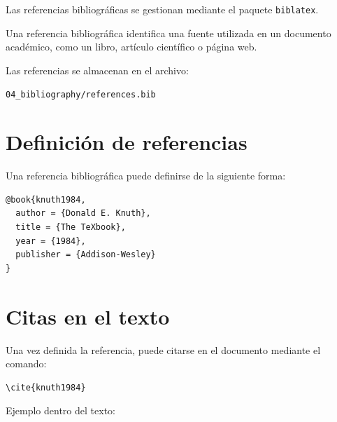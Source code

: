 Las referencias bibliográficas se gestionan mediante
el paquete \texttt{biblatex}.



\begin{definitionbox}
Una referencia bibliográfica identifica una fuente
utilizada en un documento académico, como un libro,
artículo científico o página web.
\end{definitionbox}



Las referencias se almacenan en el archivo:

\texttt{04\_bibliography/references.bib}




\section{Definición de referencias}

Una referencia bibliográfica puede definirse de la
siguiente forma:

\begin{lstlisting}[caption={Ejemplo de referencia BibTeX},label={code:bibexample}]
@book{knuth1984,
  author = {Donald E. Knuth},
  title = {The TeXbook},
  year = {1984},
  publisher = {Addison-Wesley}
}
\end{lstlisting}





\section{Citas en el texto}

Una vez definida la referencia, puede citarse en
el documento mediante el comando:

\begin{lstlisting}[caption={Cita en el texto},label={code:cite}]
\cite{knuth1984}
\end{lstlisting}




Ejemplo dentro del texto:

